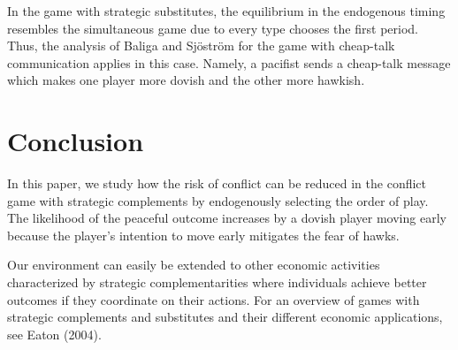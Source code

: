 \documentclass[12pt,english]{article}
\begin{document}
In the game with strategic substitutes, the equilibrium in the endogenous timing resembles the simultaneous game due to every type chooses the first period. Thus, the analysis of Baliga and Sj\"ostr\"om for the game with cheap-talk communication applies in this case. Namely, a pacifist sends a cheap-talk message which makes one player more dovish and the other more hawkish.\par \fi

\section{Conclusion}
In this paper, we study how the risk of conflict can be reduced in the conflict game with strategic complements by endogenously selecting the order of play. The likelihood of the peaceful outcome increases by a dovish player moving early because the player's intention to move early mitigates the fear of hawks.\par  %
Our environment can easily be extended to other economic activities characterized by strategic complementarities where individuals achieve better outcomes if they coordinate on their actions. For an overview of games with strategic complements and substitutes and their different economic applications, see Eaton (2004).\par %

\end{document}
